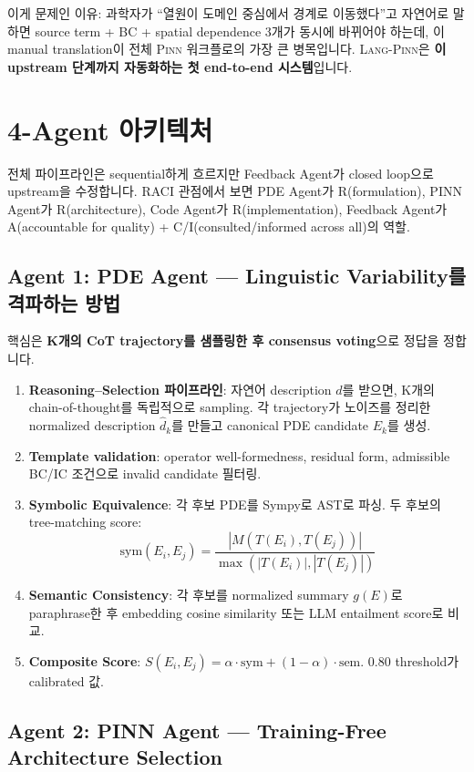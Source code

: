 \documentclass[11pt,a4paper,oneside]{report}
\newcommand{\pinn}{\textsc{Pinn}}
\newcommand{\langpinn}{\textsc{Lang-Pinn}}
\begin{document}
이게 문제인 이유: 과학자가 ``열원이 도메인 중심에서 경계로 이동했다''고 자연어로 말하면 source term + BC + spatial dependence 3개가 동시에 바뀌어야 하는데, 이 manual translation이 전체 \pinn{} 워크플로의 가장 큰 병목입니다. \langpinn{}은 \textbf{이 upstream 단계까지 자동화하는 첫 end-to-end 시스템}입니다.

\section{4-Agent 아키텍처}

전체 파이프라인은 sequential하게 흐르지만 Feedback Agent가 closed loop으로 upstream을 수정합니다. RACI 관점에서 보면 PDE Agent가 R(formulation), PINN Agent가 R(architecture), Code Agent가 R(implementation), Feedback Agent가 A(accountable for quality) + C/I(consulted/informed across all)의 역할.

\subsection{Agent 1: PDE Agent --- Linguistic Variability를 격파하는 방법}

핵심은 \textbf{K개의 CoT trajectory를 샘플링한 후 consensus voting}으로 정답을 정합니다.

\begin{enumerate}
\item \textbf{Reasoning--Selection 파이프라인}: 자연어 description $d$를 받으면, K개의 chain-of-thought를 독립적으로 sampling. 각 trajectory가 노이즈를 정리한 normalized description $\hat{d}_k$를 만들고 canonical PDE candidate $E_k$를 생성.
\item \textbf{Template validation}: operator well-formedness, residual form, admissible BC/IC 조건으로 invalid candidate 필터링.
\item \textbf{Symbolic Equivalence}: 각 후보 PDE를 Sympy로 AST로 파싱. 두 후보의 tree-matching score:
\[
\text{sym}(E_i, E_j) = \frac{|M(T(E_i), T(E_j))|}{\max(|T(E_i)|, |T(E_j)|)}
\]
\item \textbf{Semantic Consistency}: 각 후보를 normalized summary $g(E)$로 paraphrase한 후 embedding cosine similarity 또는 LLM entailment score로 비교.
\item \textbf{Composite Score}: $S(E_i, E_j) = \alpha \cdot \text{sym} + (1-\alpha) \cdot \text{sem}$. 0.80 threshold가 calibrated 값.
\end{enumerate}

\subsection{Agent 2: PINN Agent --- Training-Free Architecture Selection}
\end{document}
